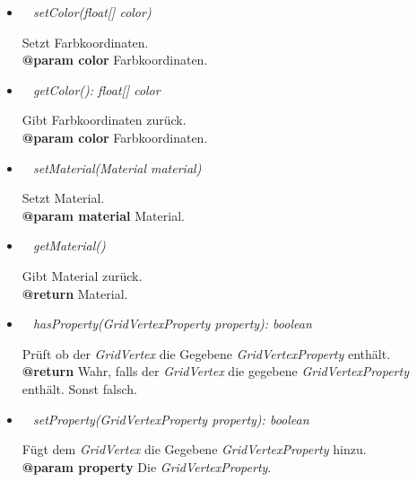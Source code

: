 \begin{itemize}
            \item  \textit{~ setColor(float[] color)}
                \begin{leftbar}[0.9\linewidth]
                    Setzt Farbkoordinaten.\\
                    \textbf{@param color} Farbkoordinaten.
                \end{leftbar}

            \item  \textit{~ getColor(): float[] color}
                \begin{leftbar}[0.9\linewidth]
                    Gibt Farbkoordinaten zurück.\\
                    \textbf{@param color} Farbkoordinaten.
                \end{leftbar}

            \item  \textit{~ setMaterial(Material material)}
                \begin{leftbar}[0.9\linewidth]
                    Setzt Material.\\
                    \textbf{@param material} Material.
                \end{leftbar}

            \item  \textit{~ getMaterial()}
                \begin{leftbar}[0.9\linewidth]
                    Gibt Material zurück.\\
                    \textbf{@return} Material.
                \end{leftbar}
            \item  \textit{~ hasProperty(GridVertexProperty property): boolean}
                \begin{leftbar}[0.9\linewidth]
                    Prüft ob der \textit{GridVertex} die Gegebene \textit{GridVertexProperty} enthält.\\
                    \textbf{@return} Wahr, falls der \textit{GridVertex} die gegebene \textit{GridVertexProperty} enthält. Sonst falsch.
                \end{leftbar}
            \item  \textit{~ setProperty(GridVertexProperty property): boolean}
                \begin{leftbar}[0.9\linewidth]
                    Fügt dem \textit{GridVertex} die Gegebene \textit{GridVertexProperty} hinzu.\\
                    \textbf{@param property} Die \textit{GridVertexProperty}.
                \end{leftbar}
        \end{itemize}

